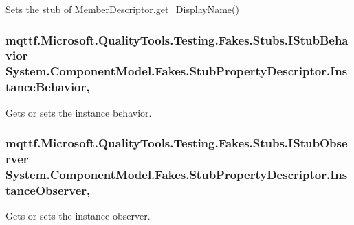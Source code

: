 Sets the stub of Member\-Descriptor.\-get\-\_\-\-Display\-Name()

\hypertarget{class_system_1_1_component_model_1_1_fakes_1_1_stub_property_descriptor_a34846851a9418e6dbed4602f24e5fa3e}{
\subsubsection[{Instance\-Behavior}]{\setlength{\rightskip}{0pt plus 5cm}mqttf.\-Microsoft.\-Quality\-Tools.\-Testing.\-Fakes.\-Stubs.\-I\-Stub\-Behavior System.\-Component\-Model.\-Fakes.\-Stub\-Property\-Descriptor.\-Instance\-Behavior\hspace{0.3cm}{\ttfamily [get]}, {\ttfamily [set]}}}\label{class_system_1_1_component_model_1_1_fakes_1_1_stub_property_descriptor_a34846851a9418e6dbed4602f24e5fa3e}


Gets or sets the instance behavior.

\hypertarget{class_system_1_1_component_model_1_1_fakes_1_1_stub_property_descriptor_acc04999259716a34bdd0bc60d05a8f66}{
\subsubsection[{Instance\-Observer}]{\setlength{\rightskip}{0pt plus 5cm}mqttf.\-Microsoft.\-Quality\-Tools.\-Testing.\-Fakes.\-Stubs.\-I\-Stub\-Observer System.\-Component\-Model.\-Fakes.\-Stub\-Property\-Descriptor.\-Instance\-Observer\hspace{0.3cm}{\ttfamily [get]}, {\ttfamily [set]}}}\label{class_system_1_1_component_model_1_1_fakes_1_1_stub_property_descriptor_acc04999259716a34bdd0bc60d05a8f66}


Gets or sets the instance observer.

